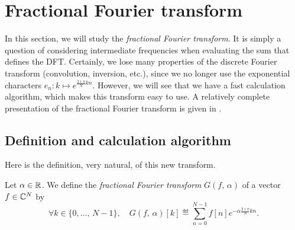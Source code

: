 \section{Fractional Fourier transform}
\label{sect1-transforme-fourier-fractionionnaire} 
 
In this section, we will study the \textit{fractional Fourier transform}. It is simply a question of considering intermediate frequencies when evaluating the sum that defines the DFT. Certainly, we lose many properties of the discrete Fourier transform (convolution, inversion, etc.), since we no longer use the exponential characters $ e_n: k \mapsto e^{\frac{2 \imath \pi }{N} kn} $. However, we will see that we have a fast calculation algorithm, which makes this transform easy to use. A relatively complete presentation of the fractional Fourier transform is given in \cite{bailey-frac-trans}.
\subsection{Definition and calculation algorithm}
\label{sect2-trans-frac} 
 
 
 Here is the definition, very natural, of this new transform.
 
\begin{defn}
 Let $ \alpha \in \mathbb{R} $. We define the \textit{fractional Fourier transform} $ G (f, \, \alpha) $ of a vector $ f \in \mathbb{C}^N $ by
\begin{equation*}
\forall k \in \{0, \ldots, \, N-1 \}, \quad G (f, \, \alpha) [k] \eqdef \sum_{n = 0}^{N-1}{f [n] e^{- \alpha \frac{2 \imath \pi}{N} kn}}.
\end{equation*}
\end{defn}
 
